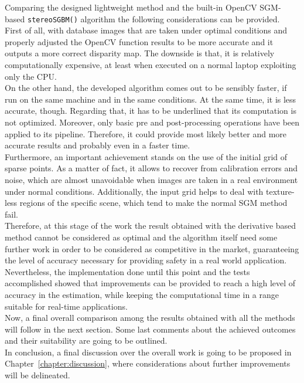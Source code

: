 Comparing the designed lightweight method and the built-in OpenCV SGM-based \texttt{stereoSGBM()} algorithm the following considerations can be provided.\\
First of all, with database images that are taken under optimal conditions and properly adjusted the OpenCV function results to be more accurate and it outputs a more correct disparity map.
The downside is that, it is relatively computationally expensive, at least when executed on a normal laptop exploiting only the CPU.\\
On the other hand, the developed algorithm comes out to be sensibly faster, if run on the same machine and in the same conditions. 
At the same time, it is less accurate, though. 
Regarding that, it has to be underlined that its computation is not optimized.
Moreover, only basic pre and post-processing operations have been applied to its pipeline.
Therefore, it could provide most likely better and more accurate results and probably even in a faster time. \\
Furthermore, an important achievement stands on the use of the initial grid of sparse points.
As a matter of fact, it allows to recover from calibration errors and noise, which are almost unavoidable when images are taken in a real environment under normal conditions.  
Additionally, the input grid helps to deal with texture-less regions of the specific scene, which tend to make the normal SGM method fail. \\
Therefore, at this stage of the work the result obtained with the derivative based method cannot be considered as optimal and the algorithm itself need some further work in order to be considered as competitive in the market, guaranteeing the level of accuracy necessary for providing safety in a real world application.
Nevertheless, the implementation done until this point and the tests accomplished showed that improvements can be provided to reach a high level of accuracy in the estimation, while keeping the computational time in a range suitable for real-time applications. \\
Now, a final overall comparison among the results obtained with all the methods will follow in the next section. 
Some last comments about the achieved outcomes and their suitability are going to be outlined. \\
In conclusion, a final discussion over the overall work is going to be proposed in Chapter~\ref{chapter:discussion}, where considerations about further improvements will be delineated. 
 
